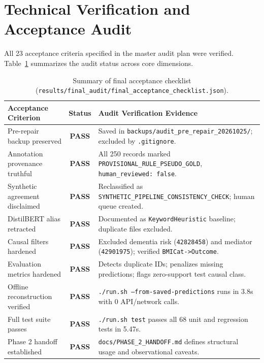 \documentclass[11pt,a4paper]{article}
\begin{document}
\section{Technical Verification and Acceptance Audit}
\label{sec:verification}

All 23 acceptance criteria specified in the master audit plan were verified. Table~\ref{tab:acceptance_summary} summarizes the audit status across core dimensions.

\begin{table}[htbp]
\centering
\small
\caption{Summary of final acceptance checklist (\texttt{results/final\_audit/final\_acceptance\_checklist.json}).}
\label{tab:acceptance_summary}
\begin{tabularx}{\textwidth}{l c X}
\toprule
\textbf{Acceptance Criterion} & \textbf{Status} & \textbf{Audit Verification Evidence} \\
\midrule
Pre-repair backup preserved & \textbf{PASS} & Saved in \texttt{backups/audit\_pre\_repair\_20261025/}; excluded by \texttt{.gitignore}. \\
Annotation provenance truthful & \textbf{PASS} & All 250 records marked \texttt{PROVISIONAL\_RULE\_PSEUDO\_GOLD}, \texttt{human\_reviewed: false}. \\
Synthetic agreement disclaimed & \textbf{PASS} & Reclassified as \texttt{SYNTHETIC\_PIPELINE\_CONSISTENCY\_CHECK}; human queue created. \\
DistilBERT alias retracted & \textbf{PASS} & Documented as \texttt{KeywordHeuristic} baseline; duplicate files excluded. \\
Causal filters hardened & \textbf{PASS} & Excluded dementia risk (\texttt{42828458}) and mediator (\texttt{42901975}); verified \texttt{BMICat->Outcome}. \\
Evaluation metrics hardened & \textbf{PASS} & Detects duplicate IDs; penalizes missing predictions; flags zero-support test causal class. \\
Offline reconstruction verified & \textbf{PASS} & \texttt{./run.sh --from-saved-predictions} runs in 3.8s with 0 API/network calls. \\
Full test suite passes & \textbf{PASS} & \texttt{./run.sh test} passes all 68 unit and regression tests in 5.47s. \\
Phase 2 handoff established & \textbf{PASS} & \texttt{docs/PHASE\_2\_HANDOFF.md} defines structural usage and observational caveats. \\
\bottomrule
\end{tabularx}
\end{table}
\end{document}
